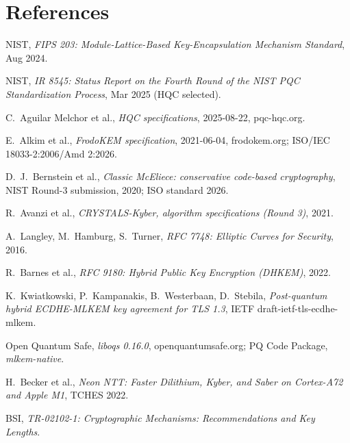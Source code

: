 \documentclass[10.5pt,a4paper]{article}
\begin{document}
\section*{References}
\footnotesize
\begin{enumerate}[label={[\arabic*]},leftmargin=2em,itemsep=0pt]
\item NIST, \emph{FIPS 203: Module-Lattice-Based Key-Encapsulation Mechanism Standard}, Aug 2024.
\item NIST, \emph{IR 8545: Status Report on the Fourth Round of the NIST PQC Standardization Process}, Mar 2025 (HQC selected).
\item C.~Aguilar Melchor et al., \emph{HQC specifications}, 2025-08-22, pqc-hqc.org.
\item E.~Alkim et al., \emph{FrodoKEM specification}, 2021-06-04, frodokem.org; ISO/IEC 18033-2:2006/Amd 2:2026.
\item D.~J.~Bernstein et al., \emph{Classic McEliece: conservative code-based cryptography}, NIST Round-3 submission, 2020; ISO standard 2026.
\item R.~Avanzi et al., \emph{CRYSTALS-Kyber, algorithm specifications (Round 3)}, 2021.
\item A.~Langley, M.~Hamburg, S.~Turner, \emph{RFC 7748: Elliptic Curves for Security}, 2016.
\item R.~Barnes et al., \emph{RFC 9180: Hybrid Public Key Encryption (DHKEM)}, 2022.
\item K.~Kwiatkowski, P.~Kampanakis, B.~Westerbaan, D.~Stebila, \emph{Post-quantum hybrid ECDHE-MLKEM key agreement for TLS 1.3}, IETF draft-ietf-tls-ecdhe-mlkem.
\item Open Quantum Safe, \emph{liboqs 0.16.0}, openquantumsafe.org; PQ Code Package, \emph{mlkem-native}.
\item H.~Becker et al., \emph{Neon NTT: Faster Dilithium, Kyber, and Saber on Cortex-A72 and Apple M1}, TCHES 2022.
\item BSI, \emph{TR-02102-1: Cryptographic Mechanisms: Recommendations and Key Lengths}.
\end{enumerate}
\end{document}
